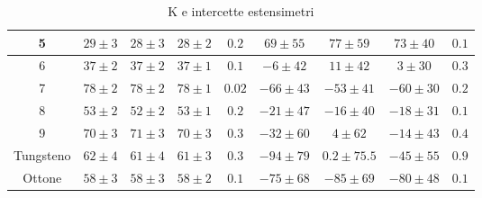 \documentclass[a4paper,11pt,oneside]{article}
\begin{document}
\begin{table}[h!]
\begin{center}
{\begin{tabular}{|c|c|c|c|c||c|c|c|c|}
    {\cellcolor[rgb]{0.85,0.85,0.85}}5 & {\cellcolor[rgb]{0.85,0.85,0.85}}$29\pm3$ & {\cellcolor[rgb]{0.85,0.85,0.85}}$28\pm3$ & {\cellcolor[rgb]{0.85,0.85,0.85}}$28\pm2$ & {\cellcolor[rgb]{0.85,0.85,0.85}}$0.2$ & {\cellcolor[rgb]{0.85,0.85,0.85}}$69\pm55$ & {\cellcolor[rgb]{0.85,0.85,0.85}}$77\pm59$ & {\cellcolor[rgb]{0.85,0.85,0.85}}$73\pm40$ & {\cellcolor[rgb]{0.85,0.85,0.85}}$0.1$\\ \hline
    6 & $37\pm2$ & $37\pm2$ & $37\pm1$ & $0.1$ & $-6\pm42$ & $11\pm42$ & $3\pm30$ & $0.3$\\ \hline
    {\cellcolor[rgb]{0.85,0.85,0.85}}7 & {\cellcolor[rgb]{0.85,0.85,0.85}}$78\pm2$ & {\cellcolor[rgb]{0.85,0.85,0.85}}$78\pm2$ & {\cellcolor[rgb]{0.85,0.85,0.85}}$78\pm1$ & {\cellcolor[rgb]{0.85,0.85,0.85}}$0.02$ & {\cellcolor[rgb]{0.85,0.85,0.85}}$-66\pm43$ & {\cellcolor[rgb]{0.85,0.85,0.85}}$-53\pm41$ & {\cellcolor[rgb]{0.85,0.85,0.85}}$-60\pm30$ & {\cellcolor[rgb]{0.85,0.85,0.85}}$0.2$\\ \hline
    8 & $53\pm2$ & $52\pm2$ & $53\pm1$ & $0.2$ & $-21\pm47$ & $-16\pm40$ & $-18\pm31$ & $0.1$\\ \hline
    {\cellcolor[rgb]{0.85,0.85,0.85}}9 & {\cellcolor[rgb]{0.85,0.85,0.85}}$70\pm3$ & {\cellcolor[rgb]{0.85,0.85,0.85}}$71\pm3$ & {\cellcolor[rgb]{0.85,0.85,0.85}}$70\pm3$ & {\cellcolor[rgb]{0.85,0.85,0.85}}$0.3$ & {\cellcolor[rgb]{0.85,0.85,0.85}}$-32\pm60$ & {\cellcolor[rgb]{0.85,0.85,0.85}}$4\pm62$ & {\cellcolor[rgb]{0.85,0.85,0.85}}$-14\pm43$ & {\cellcolor[rgb]{0.85,0.85,0.85}}$0.4$\\ \hline \hline
    Tungsteno & $62\pm4$ & $61\pm4$ & $61\pm3$ & $0.3$ & $-94\pm79$ & $0.2\pm75.5$ & $-45\pm55$ & $0.9$\\ \hline
    {\cellcolor[rgb]{0.85,0.85,0.85}}Ottone & {\cellcolor[rgb]{0.85,0.85,0.85}}$58\pm3$ & {\cellcolor[rgb]{0.85,0.85,0.85}}$58\pm3$ & {\cellcolor[rgb]{0.85,0.85,0.85}}$58\pm2$ & {\cellcolor[rgb]{0.85,0.85,0.85}}$0.1$ & {\cellcolor[rgb]{0.85,0.85,0.85}}$-75\pm68$ & {\cellcolor[rgb]{0.85,0.85,0.85}}$-85\pm69$ & {\cellcolor[rgb]{0.85,0.85,0.85}}$-80\pm48$ & {\cellcolor[rgb]{0.85,0.85,0.85}}$0.1$\\ \hline
    \end{tabular}}
    \end{center}
    \caption{K e intercette estensimetri}
    \label{tab:k_est}
\end{table}
\end{document}
